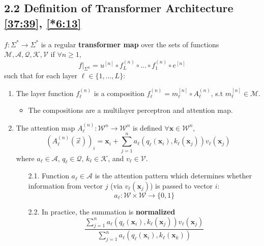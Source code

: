 \documentclass[12pt, twoside]{article}
\begin{document}
\subsection*{2.2 Definition of Transformer Architecture \href{https://youtu.be/DR8bQPoRlX8?si=7ShQDJNzFFenFIuP&t=2253}{[37:39]}, \href{https://youtu.be/1u6h3Nm3NvM?si=Orlh2gRtZ3yXKfI9&t=373}{[*6:13]}}

\begin{definition} \label{def:2.4}
$f: \Sigma^* \to \Sigma^*$ is a regular \textbf{transformer map} over the sets of functions $\mathcal{M}, \mathcal{A}, \mathcal{Q}, \mathcal{K}, \mathcal{V}$ if $\forall n \ge 1$,
\[
f|_{\Sigma^n} = u^{[n]} \circ f_L^{(n)} \circ \dots \circ f_1^{(n)} \circ e^{[n]}
\]
such that for each layer $\ell \in \{1, \dots, L\}$:
\begin{enumerate}
    \item The layer function $f_\ell^{(n)}$ is a composition $f_\ell^{(n)} = m_\ell^{[n]} \circ A_\ell^{(n)}$, s.t $m_\ell^{[n]} \in \mathcal{M}$.
    \begin{itemize}
        \item The compositions are a multilayer perceptron and attention map.

    \end{itemize}

    \item The attention map $A_\ell^{(n)}: \mathcal{W}^n \to \mathcal{W}^n$ is defined $\forall \mathbf{x} \in\mathcal{W}^n$,
    \[
    (A_\ell^{(n)}(\Vec{x}))_i = \mathbf{x}_i + \sum_{j=1}^{n} a_\ell(q_\ell(\mathbf{x}_i), k_\ell(\mathbf{x}_j))v_\ell(\mathbf{x}_j)
    \]
    where $a_\ell \in \mathcal{A}$, $q_\ell \in \mathcal{Q}$, $k_\ell \in \mathcal{K}$, and $v_\ell \in \mathcal{V}$.

    \begin{enumerate}
    \item[{2.1.}] Function $a_\ell \in \mathcal{A}$ is the attention pattern which determines whether information from vector $j$ (via $v_\ell(\mathbf{x}_j)$) is passed to vector $i$:
    \[
    a_\ell: \mathcal{W} \times \mathcal{W} \to \{0, 1\}
    \]

    \item[{2.2.}] In practice, the summation is \textbf{normalized}
        \[
         \frac{\sum_{j=1}^{n}a_\ell(q_\ell(\mathbf{x}_i), k_\ell(\mathbf{x}_j))v_\ell(\mathbf{x}_j)}{\sum_{j=1}^{n} a_\ell(q_\ell(\mathbf{x}_i), k_\ell(\mathbf{x}_k))}
        \]


\end{enumerate}
\end{enumerate}
\end{definition}
\end{document}
